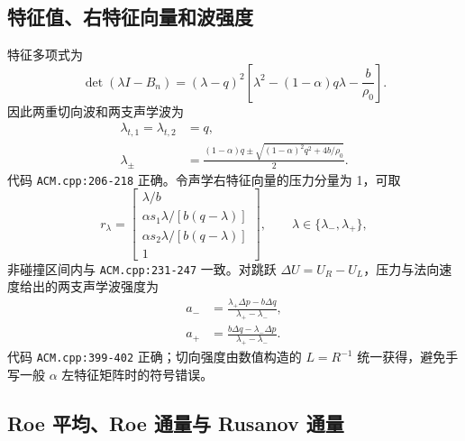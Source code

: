 \documentclass[UTF8,11pt,a4paper]{ctexart}
\newcommand{\code}[1]{\nolinkurl{#1}}
\begin{document}
\noindent{}

\subsection{特征值、右特征向量和波强度}

特征多项式为
\begin{equation}
 \det(\lambda I-B_n)
 =(\lambda-q)^2\left[\lambda^2-(1-\alpha)q\lambda-\frac{b}{\rho_0}\right].
 \label{eq:charpoly}
\end{equation}
因此两重切向波和两支声学波为
\begin{align}
 \lambda_{t,1}=\lambda_{t,2}&=q,\\
 \lambda_{\pm}&=\frac{(1-\alpha)q\pm
 \sqrt{(1-\alpha)^2q^2+4b/\rho_0}}{2}.
 \label{eq:eigenvalues}
\end{align}
代码 \code{ACM.cpp:206-218} 正确。令声学右特征向量的压力分量为 1，可取
\begin{equation}
 r_{\lambda}=
 \begin{bmatrix}
 \lambda/b\\
 \alpha s_1\lambda/[b(q-\lambda)]\\
 \alpha s_2\lambda/[b(q-\lambda)]\\
 1
 \end{bmatrix},\qquad \lambda\in\{\lambda_-,\lambda_+\},
 \label{eq:acoustic-r}
\end{equation}
非碰撞区间内与 \code{ACM.cpp:231-247} 一致。对跳跃 $\Delta U=U_R-U_L$，压力与法向速度给出的两支声学波强度为
\begin{align}
 a_-&=\frac{\lambda_+\Delta p-b\Delta q}{\lambda_+-\lambda_-},\\
 a_+&=\frac{b\Delta q-\lambda_-\Delta p}{\lambda_+-\lambda_-}.
 \label{eq:wave-strengths}
\end{align}
代码 \code{ACM.cpp:399-402} 正确；切向强度由数值构造的 $L=R^{-1}$ 统一获得，避免手写一般 $\alpha$ 左特征矩阵时的符号错误。

\subsection{Roe 平均、Roe 通量与 Rusanov 通量}
\end{document}
